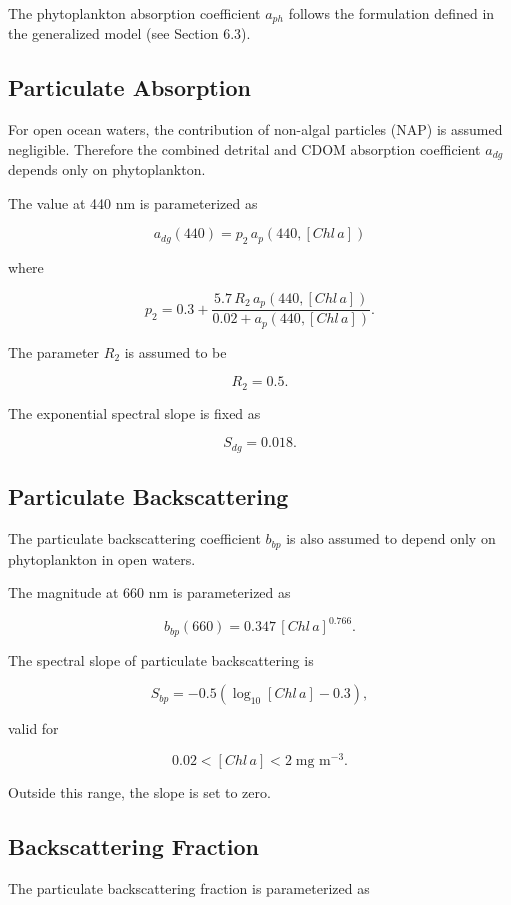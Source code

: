 \documentclass[
  11pt,
  letterpaper,
]{scrreprt}
\begin{document}
The phytoplankton absorption coefficient \(a_{ph}\) follows the
formulation defined in the generalized model (see Section 6.3).

\subsection{Particulate Absorption}\label{particulate-absorption}

For open ocean waters, the contribution of non-algal particles (NAP) is
assumed negligible. Therefore the combined detrital and CDOM absorption
coefficient \(a_{dg}\) depends only on phytoplankton.

The value at 440 nm is parameterized as

\[
a_{dg}(440) = p_2\, a_p(440,[Chl\,a])
\]

where

\[
p_2 = 0.3 + \frac{5.7\,R_2\,a_p(440,[Chl\,a])}{0.02 + a_p(440,[Chl\,a])}.
\]

The parameter \(R_2\) is assumed to be

\[
R_2 = 0.5.
\]

The exponential spectral slope is fixed as

\[
S_{dg} = 0.018.
\]

\subsection{Particulate
Backscattering}\label{particulate-backscattering}

The particulate backscattering coefficient \(b_{bp}\) is also assumed to
depend only on phytoplankton in open waters.

The magnitude at 660 nm is parameterized as

\[
b_{bp}(660) = 0.347\,[Chl\,a]^{0.766}.
\]

The spectral slope of particulate backscattering is

\[
S_{bp} = -0.5\left(\log_{10}[Chl\,a] - 0.3\right),
\]

valid for

\[
0.02 < [Chl\,a] < 2 \; \text{mg m}^{-3}.
\]

Outside this range, the slope is set to zero.

\subsection{Backscattering Fraction}\label{backscattering-fraction}

The particulate backscattering fraction is parameterized as
\end{document}
